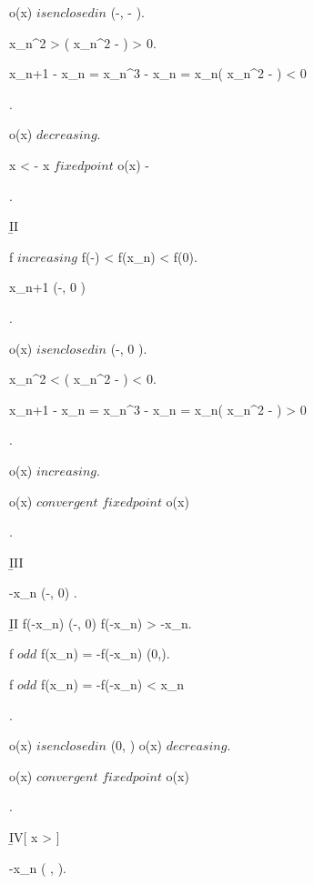 \documentclass[../Main/main]{subfiles}
\begin{document}
{{{{				\conclude o(x) $ is enclosed in $ (-\infty, - ).
		

				{
					x_n^2 >  \imp ( x_n^2 - ) > 0.

					x_{n+1} - x_n = x_n^3 - x_n = x_n( x_n^2 - ) < 0

				}.
				
				\conclude o(x) $ decreasing $.

				\nexists \;  x < -  \suchthat x $ fixed point $ \imp o(x) \convergesto - \infty				
			}.






			\b{II} 
			{
				{
					f $ increasing $ \imp f(-) < f(x_n) < f(0).

					x_{n+1} \in (-, 0 )
				}.

				\conclude o(x) $ is enclosed in $ (-, 0 ).

				{
					x_n^2 <  \imp ( x_n^2 - ) < 0.

					x_{n+1} - x_n = x_n^3 - x_n = x_n( x_n^2 - ) > 0

				}.

				\conclude o(x) $ increasing $.

				o(x) $ convergent $  $ fixed point $ \imp o(x) 
			}.
		

			\b{III}
			{
				{
					-x_n \in (-, 0) .

					\b{II} \imp f(-x_n) \in (-, 0) \logicAnd f(-x_n) > -x_n.

					f $ odd $ \imp f(x_n) = -f(-x_n) \in (0,).

					f $ odd $ \imp f(x_n) = -f(-x_n) < x_n
				}.

				\conclude o(x) $ is enclosed in $ (0,  ) \logicAnd o(x) $ decreasing $.

				o(x) $ convergent $  $ fixed point $ \imp o(x) 
				
			}.


			\b{IV}[ x >  ]
			{
				{
					-x_n \in ( , \infty).

}}}}}
\end{document}
